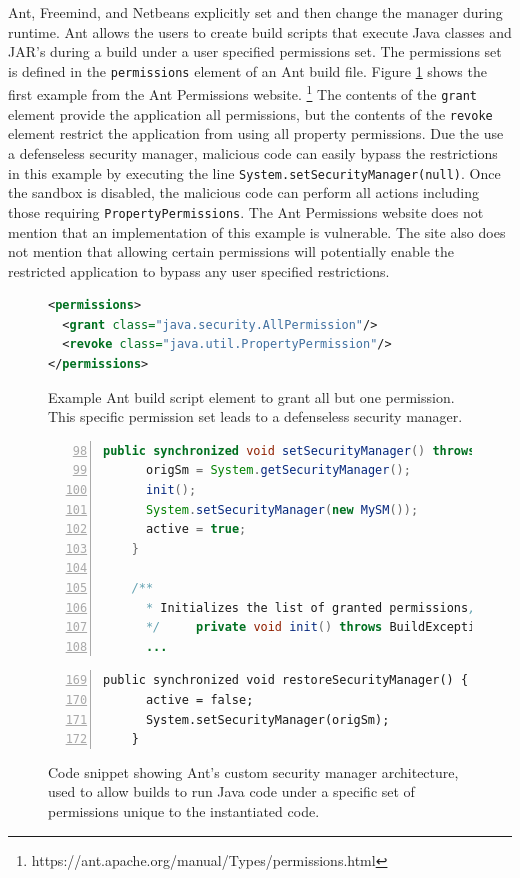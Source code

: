 \documentclass{sig-alternate}
\begin{document}
Ant, Freemind, and Netbeans explicitly set and then change the manager
during runtime. Ant allows the users to create build scripts that
execute Java classes and JAR's during a build under a user specified
permissions set. The permissions set is defined in the \texttt{permissions}
element of an Ant build file. Figure \ref{fig:Ant Permissions Example}
shows the first example from the Ant Permissions website.%
\footnote{https://ant.apache.org/manual/Types/permissions.html%
} The contents of the \texttt{grant} element provide the application
all permissions, but the contents of the \texttt{revoke} element restrict
the application from using all property permissions. Due the use a
defenseless security manager, malicious code can easily bypass the
restrictions in this example by executing the line \texttt{System.setSecurityManager(null)}.
Once the sandbox is disabled, the malicious code can perform all actions
including those requiring \texttt{PropertyPermissions}. The Ant Permissions
website does not mention that an implementation of this example is
vulnerable. The site also does not mention that allowing certain permissions
will potentially enable the restricted application to bypass any user
specified restrictions. 
\begin{figure}
\begin{lstlisting}[language=XML,basicstyle={\scriptsize}]
<permissions>   
  <grant class="java.security.AllPermission"/>   
  <revoke class="java.util.PropertyPermission"/> 
</permissions>
\end{lstlisting}


\caption{Example Ant build script element to grant all but one permission.
This specific permission set leads to a defenseless security manager.}
\label{fig:Ant Permissions Example}
\end{figure}


\begin{figure}
\begin{lstlisting}[language=Java,numbers=left,basicstyle={\scriptsize},breaklines=true,firstnumber=98,xrightmargin={0.1cm},numbersep={-10pt}]
    public synchronized void setSecurityManager() throws BuildException {         
      origSm = System.getSecurityManager();         
      init();         
      System.setSecurityManager(new MySM());         
      active = true;     
    }
    
    /**      
      * Initializes the list of granted permissions, checks the list of revoked permissions.      
      */     private void init() throws BuildException {
      ...
\end{lstlisting}
\begin{lstlisting}[numbers=left,basicstyle={\scriptsize},firstnumber=169,xrightmargin={0.1cm},numbersep={-10pt}]
    public synchronized void restoreSecurityManager() {         
      active = false;         
      System.setSecurityManager(origSm);     
    }
\end{lstlisting}
\protect\caption{Code snippet showing Ant's custom security manager architecture, used
to allow builds to run Java code under a specific set of permissions
unique to the instantiated code.}
\label{fig:Ant-Permissions-Enforcement}
\end{figure}
\end{document}
